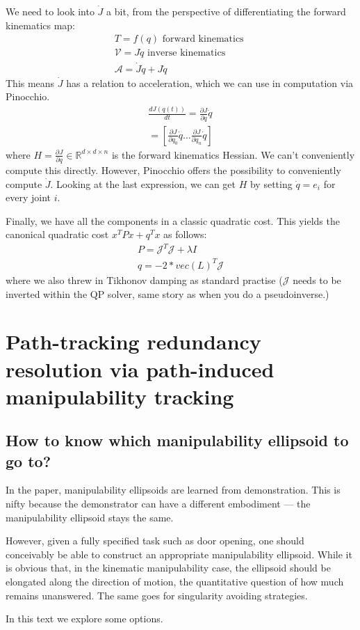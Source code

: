 \documentclass{article}
\begin{document}
We need to look into $ \dot{J}  $ a bit, from the perspective of 
differentiating the forward kinematics map:
\begin{gather}
T = f (q) \text{ forward kinematics }\\
\mathcal{V} = J \dot{q}\text{ inverse kinematics }\\
\mathcal{A} = \dot{J} \dot{q} + J \ddot{q}
\end{gather}
This means $ \dot{J}  $ has a relation to acceleration, which we can use in computation
via Pinocchio.
\begin{gather}
\frac{d J (q (t))}{dt} =
\frac{\partial J}{\partial q} \dot{q} \\
= \left[ 
\frac{\partial J}{\partial q_{ 0 }} \dot{q} \dots \frac{\partial J}{\partial q_{ n }} \dot{q}
\right] 
\end{gather}
where $ H = \frac{\partial J}{\partial q}  \in \mathbb{R}^{d \times d \times n}$
is the forward kinematics Hessian.
We can't conveniently compute this directly.
However, Pinocchio offers the possibility to conveniently compute $ \dot{J}  $.
Looking at the last expression,
we can get $ H  $ by setting $ \dot{q} = e_{ i }  $ for every joint $ i  $.

Finally, we have all the components in a classic quadratic cost. This yields
the canonical quadratic cost $ x^{ T }Px + q^{ T }x  $ as follows:
\begin{gather}
		P = \mathcal{J}^{ T } \mathcal{J} + \lambda  I \\
		q = -2 * vec(L)^{  T} \mathcal{J}
\end{gather}
where we also threw in Tikhonov damping as standard practise 
($ \mathcal{J}  $ needs to be inverted within the QP solver, same story
as when you do a pseudoinverse.)

\section{Path-tracking redundancy resolution via path-induced manipulability tracking}
\subsection{How to know which manipulability ellipsoid to go to?}
In the paper, manipulability ellipsoids are learned from demonstration.
This is nifty because the demonstrator can have a different embodiment ---
the manipulability ellipsoid stays the same.

However, given a fully specified task such as door opening, one should
conceivably be able to construct an appropriate manipulability ellipsoid.
While it is obvious that, in the kinematic manipulability case,
the ellipsoid should be elongated along the direction of motion,
the quantitative question of how much remains unanswered.
The same goes for singularity avoiding strategies.

In this text we explore some options.


\printbibliography
\end{document}
